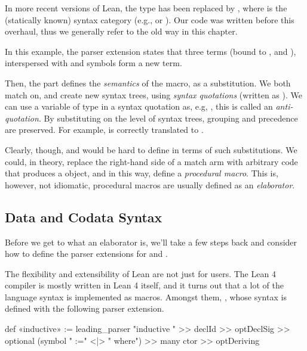 \begin{remark}
    In more recent versions of Lean, the  type has been replaced by , where  is the (statically known) syntax category (e.g.,  or ).
    Our code was written before this overhaul, thus we generally refer to the old way in this chapter.
\end{remark}


In this example, the parser extension states that three terms (bound to ,  and ), interspersed with  and \lean{:} symbols form a new term.

Then, the 
part defines the \emph{semantics} of the macro, as a substitution. We both match on, and create new syntax trees, using \emph{syntax quotations} (written as ). We can use a variable of type  in a syntax quotation as, e.g, , this is called an \emph{anti-quotation}. By substituting on the level of syntax trees, grouping and precedence are preserved. For example,  is correctly translated
to .

Clearly, though, \data{} and \codata{} would be hard to define in terms of such substitutions.
We could, in theory, replace the right-hand side of a  match arm 
with arbitrary code that produces a  object, and in this way, define a \emph{procedural macro}.
This is, however, not idiomatic, procedural macros are usually defined as an \emph{elaborator}.


\subsection*{Data and Codata Syntax}%
\label{subsec:impl:syntax}

Before we get to what an elaborator is, we'll take a few steps back and consider how to define the parser extensions for \data{} and \codata{}.

The flexibility and extensibility of Lean are not just for users. The Lean 4 compiler is mostly written in Lean 4 itself, and it turns out that a lot of the language syntax is implemented as macros. Amongst them, \inductive{},
whose syntax is defined with the following parser extension.
\begin{leancode}
  def «inductive» := leading_parser "inductive " >> declId >> optDeclSig 
                      >> optional (symbol " :=" <|> " where") 
                      >> many ctor 
                      >> optDeriving
\end{leancode}

